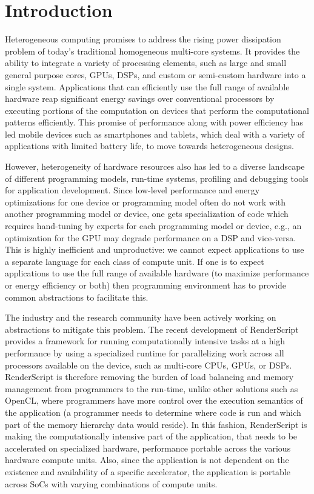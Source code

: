 \section{Introduction}

Heterogeneous computing promises to address the rising power dissipation problem
of today's traditional homogeneous multi-core
systems. It provides the ability to integrate a variety of processing elements,
such as large and small general purpose cores, GPUs, DSPs, and custom or
semi-custom hardware into a single system. Applications that can efficiently use
the full range of available hardware reap significant energy
savings over conventional processors by executing portions of the computation on
devices that perform the computational patterns efficiently.
This promise of performance along with power efficiency
has led mobile devices such as smartphones
and tablets, which deal with a variety of applications with limited battery
life, to move towards heterogeneous designs.

However, heterogeneity of hardware resources also has led to a diverse landscape
of different programming models, run-time systems, profiling and debugging tools
for application development. Since low-level performance and energy
optimizations for one device or
programming model often do not work with another programming model or device, 
one gets specialization of code which requires hand-tuning by experts for each 
programming model or device, e.g., an optimization for the GPU may degrade performance
on a DSP and vice-versa. This is highly inefficient and
unproductive: we cannot expect applications to use a separate language for each
class of compute unit. If one is to expect applications to use the full range of
available hardware (to maximize performance or energy efficiency or both) then
programming environment has to provide common abstractions to facilitate this.

The industry and the research community have been actively working on abstractions
    to mitigate this problem.
The recent development of RenderScript~\cite{wiki:RenderScript, RenderScript}
provides a framework for running computationally intensive tasks at a high
performance by using a specialized runtime for parallelizing work across all
processors available on the device, such as multi-core CPUs, GPUs, or DSPs.
RenderScript is therefore removing the burden of load balancing and memory
management from programmers to the run-time, unlike other solutions such as
OpenCL, where programmers have more control over the execution semantics of
the application (a programmer needs to determine where code is run and
 which part of the memory hierarchy data would reside).  In this fashion,
RenderScript is making the computationally intensive part of the application,
that needs to be accelerated on specialized hardware, performance portable
across the various hardware compute units. Also, since the application is not
dependent on the existence and availability of a specific accelerator, the
application is portable across SoCs with varying combinations of compute units.

